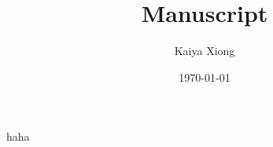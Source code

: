 \documentclass{article}
\title{Manuscript}
\author{Kaiya Xiong}
\date{\today}
\begin{document}
\maketitle
haha
\end{document}
